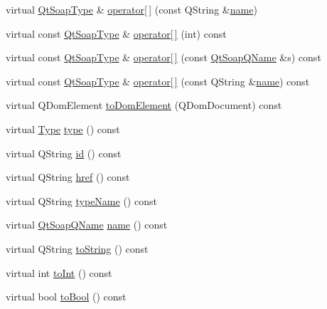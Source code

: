 \begin{DoxyCompactItemize}
\item 
virtual \mbox{\hyperlink{class_qt_soap_type}{Qt\+Soap\+Type}} \& \mbox{\hyperlink{class_qt_soap_type_ab49b12d815d07f5afda6644f097063ba}{operator\mbox{[}$\,$\mbox{]}}} (const Q\+String \&\mbox{\hyperlink{class_qt_soap_type_a6d5fb3d1ea4cf6d1432c7f62a5da09c3}{name}})
\item 
virtual const \mbox{\hyperlink{class_qt_soap_type}{Qt\+Soap\+Type}} \& \mbox{\hyperlink{class_qt_soap_type_a7d49c20ea814bd667f13c3b1f40f1a47}{operator\mbox{[}$\,$\mbox{]}}} (int) const
\item 
virtual const \mbox{\hyperlink{class_qt_soap_type}{Qt\+Soap\+Type}} \& \mbox{\hyperlink{class_qt_soap_type_af77eaf6be2bfbf3635195146a579861b}{operator\mbox{[}$\,$\mbox{]}}} (const \mbox{\hyperlink{class_qt_soap_q_name}{Qt\+Soap\+Q\+Name}} \&s) const
\item 
virtual const \mbox{\hyperlink{class_qt_soap_type}{Qt\+Soap\+Type}} \& \mbox{\hyperlink{class_qt_soap_type_a00a0a5b42133b407a302982969d6a168}{operator\mbox{[}$\,$\mbox{]}}} (const Q\+String \&\mbox{\hyperlink{class_qt_soap_type_a6d5fb3d1ea4cf6d1432c7f62a5da09c3}{name}}) const
\item 
virtual Q\+Dom\+Element \mbox{\hyperlink{class_qt_soap_type_a77b7274ffbc9374187a2cc8cca27cdb6}{to\+Dom\+Element}} (Q\+Dom\+Document) const
\item 
virtual \mbox{\hyperlink{class_qt_soap_type_a840b69f1d92eeb4e64ae1e0439d54683}{Type}} \mbox{\hyperlink{class_qt_soap_type_acd4282b8a4b6a709c3504cc976335fba}{type}} () const
\item 
virtual Q\+String \mbox{\hyperlink{class_qt_soap_type_a77376306cd4807467b3d97ff8ce68ff5}{id}} () const
\item 
virtual Q\+String \mbox{\hyperlink{class_qt_soap_type_a47872406cda4698fc49b7fd5817bbd71}{href}} () const
\item 
virtual Q\+String \mbox{\hyperlink{class_qt_soap_type_a5e5fc74b7b3e614d9db6cc0c4bbf9dbf}{type\+Name}} () const
\item 
virtual \mbox{\hyperlink{class_qt_soap_q_name}{Qt\+Soap\+Q\+Name}} \mbox{\hyperlink{class_qt_soap_type_a6d5fb3d1ea4cf6d1432c7f62a5da09c3}{name}} () const
\item 
virtual Q\+String \mbox{\hyperlink{class_qt_soap_type_a253d268332ea0b2ebba6ee52522fa685}{to\+String}} () const
\item 
virtual int \mbox{\hyperlink{class_qt_soap_type_a5a94747abe5773d9bc83aff7f7efe9ee}{to\+Int}} () const
\item 
virtual bool \mbox{\hyperlink{class_qt_soap_type_a39a2d84fd4458d82568c83489f66a01d}{to\+Bool}} () const

\end{DoxyCompactItemize}
